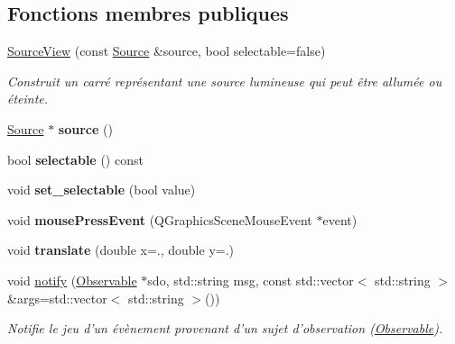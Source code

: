 \subsection*{Fonctions membres publiques}
\begin{DoxyCompactItemize}
\item 
\hyperlink{classSourceView_a978bb2492cf5379d407ee448f554dda6}{Source\+View} (const \hyperlink{classSource}{Source} \&source, bool selectable=false)
\begin{DoxyCompactList}\small\item\em Construit un carré représentant une source lumineuse qui peut être allumée ou éteinte. \end{DoxyCompactList}\item 
\hypertarget{classSourceView_a39b5010fa2f3c764638d0c01eb97f616}{\hyperlink{classSource}{Source} $\ast$ {\bfseries source} ()}\label{classSourceView_a39b5010fa2f3c764638d0c01eb97f616}

\item 
\hypertarget{classSourceView_ab6c051d55846c3880a8f2672650327aa}{bool {\bfseries selectable} () const }\label{classSourceView_ab6c051d55846c3880a8f2672650327aa}

\item 
\hypertarget{classSourceView_a64f81b9f42abf51e39b4b16fb8be3dff}{void {\bfseries set\+\_\+selectable} (bool value)}\label{classSourceView_a64f81b9f42abf51e39b4b16fb8be3dff}

\item 
\hypertarget{classSourceView_a2f37fc1a515963e606a0a45ab66464df}{void {\bfseries mouse\+Press\+Event} (Q\+Graphics\+Scene\+Mouse\+Event $\ast$event)}\label{classSourceView_a2f37fc1a515963e606a0a45ab66464df}

\item 
\hypertarget{classSourceView_ac7b25fb739c079c2414f6d38d534e12e}{void {\bfseries translate} (double x=., double y=.)}\label{classSourceView_ac7b25fb739c079c2414f6d38d534e12e}

\item 
void \hyperlink{classSourceView_af536ad257f0b203ebc4851103cab69b6}{notify} (\hyperlink{classObservable}{Observable} $\ast$sdo, std\+::string msg, const std\+::vector$<$ std\+::string $>$ \&args=std\+::vector$<$ std\+::string $>$())
\begin{DoxyCompactList}\small\item\em Notifie le jeu d'un évènement provenant d'un sujet d'observation (\hyperlink{classObservable}{Observable}). \end{DoxyCompactList}\end{DoxyCompactItemize}
